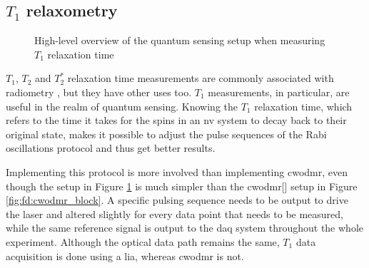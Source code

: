 \subsection{$T_1$ relaxometry}\label{chap:fd:t1}
\begin{figure}[!ht]
	\centering
	\caption{High-level overview of the quantum sensing setup when measuring $T_1$ relaxation time}
	\label{fig:fd:t1_block}
\end{figure}

$T_1$, $T_2$ and $T_2^*$ relaxation time measurements are commonly associated with radiometry \cite{ballinger23}, but they have other uses too. $T_1$ measurements, in particular, are useful in the realm of quantum sensing. Knowing the $T_1$ relaxation time, which refers to the time it takes for the spins in an \gls{nv} system to decay back to their original state, makes it possible to adjust the pulse sequences of the Rabi oscillations protocol and thus get better results. 

Implementing this protocol is more involved than implementing \gls{cwodmr}, even though the setup in Figure \ref{fig:fd:t1_block} is much simpler than the \gls{cwodmr}[] setup in Figure \ref{fig:fd:cwodmr_block}. A specific pulsing sequence needs to be output to drive the laser and altered slightly for every data point that needs to be measured, while the same reference signal is output to the \gls{daq} system throughout the whole experiment. Although the optical data path remains the same, $T_1$ data acquisition is done using a \gls{lia}, whereas \gls{cwodmr} is not. 

